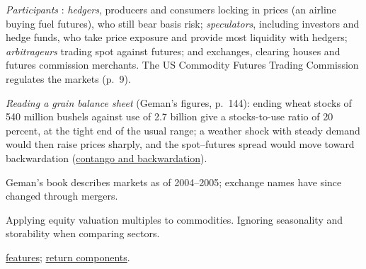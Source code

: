 \begin{qfmethod}
\emph{Participants} \citep[pp.~6--10]{physical-geman-commodities-2005}: \emph{hedgers}, producers and consumers locking in prices (an airline buying fuel futures), who still bear basis risk; \emph{speculators}, including investors and hedge funds, who take price exposure and provide most liquidity with hedgers; \emph{arbitrageurs} trading spot against futures; and exchanges, clearing houses and futures commission merchants. The US Commodity Futures Trading Commission regulates the markets (p.~9).

 \emph{Reading a grain balance sheet} (Geman's figures, p.~144): ending wheat stocks of 540 million bushels against use of 2.7 billion give a stocks-to-use ratio of 20 percent, at the tight end of the usual range; a weather shock with steady demand would then raise prices sharply, and the spot--futures spread would move toward backwardation (\hyperref[def:contango-backwardation-stocks]{contango and backwardation}).

 Geman's book describes markets as of 2004--2005; exchange names have since changed through mergers.

 Applying equity valuation multiples to commodities. Ignoring seasonality and storability when comparing sectors.

 \hyperref[def:commodity-features]{features}; \hyperref[meth:commodity-futures-return-components]{return components}.

\end{qfmethod}

